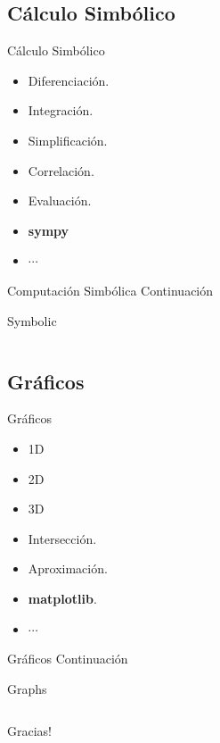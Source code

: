 \documentclass[usenames, dvipsnames, compress]{beamer}
\begin{document}
		\subsection{Cálculo Simbólico}
		\begin{frame}{Cálculo Simbólico}
		\begin{itemize}[<+- | alert@ +>]
			\item Diferenciación.
			\item Integración.
			\item Simplificación.
			\item Correlación.
			\item Evaluación.
			\item \textbf{sympy}
			\item $\cdots$
		\end{itemize}
		\end{frame}
		\begin{frame}{Computación Simbólica Continuación}
		\begin{block}{Symbolic}
		\inputminted[xleftmargin=\parindent,linenos]{python}{codes/symbolic_computation.py}
		\end{block}
		\end{frame}
		\subsection{Gráficos}
		\begin{frame}{Gráficos}
		\begin{itemize}[<+- | alert@ +>]
			\item 1D
			\item 2D
			\item 3D
			\item Intersección.
			\item Aproximación.
			\item \textbf{matplotlib}.
			\item $\cdots$
		\end{itemize}
	\end{frame}
	\begin{frame}{Gráficos Continuación}
	\begin{block}{Graphs}
	\inputminted[xleftmargin=\parindent,linenos]{python}{codes/graphs.py}
	\end{block}
	\end{frame}
	\begin{frame}[standout]
	Gracias!
	\end{frame}
\end{document}
